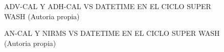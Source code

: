 \begin{figure}[H]
  \hfill
  \hfill
  \hfill
  \caption{ADV-CAL Y ADH-CAL VS DATETIME EN EL CICLO SUPER WASH (Autoria propia)}
  \end{figure}
\begin{figure}[H]
  \hfill
  \hfill
  \hfill
  \caption{AN-CAL Y NIRMS VS DATETIME EN EL CICLO SUPER WASH (Autoria propia)}
  \end{figure}

